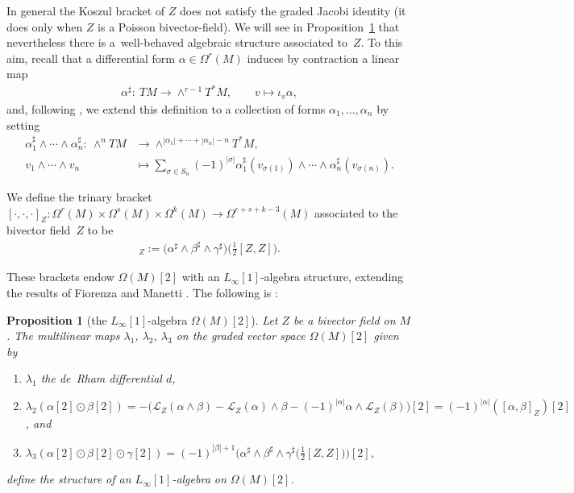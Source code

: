 \documentclass[10pt,a4paper]{amsart}
\numberwithin{equation}{section}
\newtheorem{Proposition}[Theorem]{Proposition}
 { \theoremstyle{definition}
\newtheorem{Definition}[Theorem]{Definition}
\newtheorem{Remark}[Theorem]{Remark} }
\newcommand{\Lie}{\mathcal{L}}
\begin{document}
In general the Koszul bracket of $Z$ does not satisfy the graded Jacobi identity (it does only when $Z$ is a Poisson bivector-field). We will see in Proposition~\ref{proposition: extended Koszul} that nevertheless there is a~well-behaved algebraic structure associated to~$Z$. To this aim, recall that a differential form $\alpha \in \Omega^r(M)$ induces by contraction a linear map
\begin{gather*}\alpha^\sharp\colon \ TM \to \wedge^{r-1}T^*M, \qquad v \mapsto \iota_v\alpha,\end{gather*}
and, following \cite[Section~2.3]{FZgeo}, we extend this definition to a collection of forms $\alpha_1,\dots,\alpha_n$ by setting
\begin{align*}
 \alpha_1^\sharp \wedge \cdots \wedge \alpha_n^\sharp\colon \ \wedge^n TM &\to \wedge^{|\alpha_1|+\cdots +|\alpha_n|-n}T^*M, \\
 v_1\wedge \cdots \wedge v_n & \mapsto \sum_{\sigma \in S_n}(-1)^{|\sigma|}\alpha_1^\sharp(v_{\sigma(1)})\wedge \cdots \wedge \alpha_n^\sharp(v_{\sigma(n)}).
\end{align*}

\begin{Definition}\label{definition: trinary bracket}We define the trinary bracket $[\cdot,\cdot,\cdot]_Z\colon \Omega^r(M)\times \Omega^s(M)\times \Omega^k(M)\!\to\! \Omega^{r+s+k-3}(M)$ associated to the bivector field~$Z$
to be
\begin{gather*}[\alpha,\beta,\gamma]_Z:= \big(\alpha^\sharp \wedge \beta^\sharp \wedge \gamma^\sharp\big)\big(\tfrac{1}{2}[Z,Z]\big).\end{gather*}
\end{Definition}

These brackets endow $\Omega(M)[2]$ with an $L_\infty[1]$-algebra structure, extending the results of Fiorenza and Manetti \cite{Fiorenza--ManettiForm}. The following is \cite[Proposition~3.5]{SZPre}:
\begin{Proposition}[the {$L_\infty[1]$}-algebra {$\Omega(M)[2]$}] \label{proposition: extended Koszul} Let $Z$ be a bivector field on $M$. The multilinear maps $\lambda_1$, $\lambda_2$, $\lambda_3$ on the graded vector space $\Omega(M)[2]$ given by
\begin{enumerate}\itemsep=0pt
\item[$1)$] $\lambda_1$ the de~Rham differential $d$,
\item[$2)$] $\lambda_2(\alpha[2] \odot \beta[2])=-\big(\Lie_Z(\alpha\wedge \beta) - \Lie_Z(\alpha)\wedge \beta - (-1)^{\vert \alpha \vert}\alpha \wedge \Lie_Z(\beta)\big)[2] = (-1)^{|\alpha|} ([\alpha,\beta]_Z)[2]$, and
\item[$3)$] $\lambda_3(\alpha[2]\odot \beta[2]\odot \gamma[2])=(-1)^{|\beta|+1}\big(\alpha^\sharp\wedge \beta^\sharp \wedge \gamma^\sharp\big(\frac{1}{2}[Z,Z]\big)\big)[2]$,
\end{enumerate}
define the structure of an $L_\infty[1]$-algebra on $\Omega(M)[2]$.
\end{Proposition}
\end{document}
